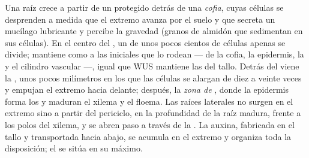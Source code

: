 \begin{proposition}\label{prop:b2:plant-meristems:ram}
Una raíz crece a partir de un  protegido detrás de una
\emph{cofia}, cuyas células se desprenden a medida que el extremo avanza
por el suelo y que secreta un mucílago lubricante y percibe la gravedad
(granos de almidón que sedimentan en sus células). En el centro del
, un \emph{} de unos pocos cientos de células
apenas se divide; mantiene como  a las iniciales que lo
rodean --- de la cofia, la epidermis, la  y el cilindro vascular
---, igual que WUS mantiene las del tallo. Detrás del  viene la
\emph{}, unos pocos milímetros en los que las células se
alargan de diez a veinte veces y empujan el extremo hacia delante;
después, la \emph{zona de }, donde la epidermis forma los
\emph{} y maduran el xilema y el floema. Las raíces
laterales no surgen en el extremo sino a partir del periciclo, en la
profundidad de la raíz madura, frente a los polos del xilema, y se abren
paso a través de la . La auxina, fabricada en el tallo y
transportada hacia abajo, se acumula en el extremo y organiza toda la
disposición; el  se sitúa en su máximo.
\end{proposition}

